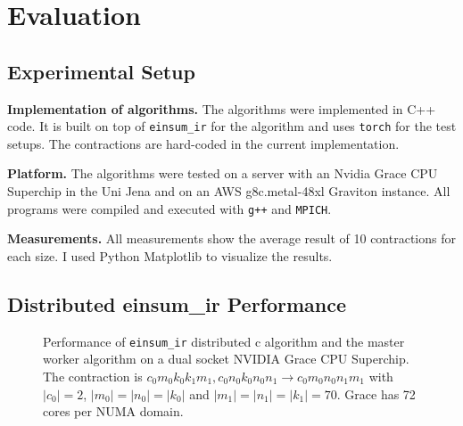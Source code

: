 \section{Evaluation}

\subsection{Experimental Setup}

\textbf{Implementation of algorithms.}
The algorithms were implemented in C++ code.
It is built on top of \texttt{einsum\_ir} for the algorithm and uses \texttt{torch} for the test setups.
The contractions are hard-coded in the current implementation.

\textbf{Platform.}
The algorithms were tested on a server with an Nvidia Grace CPU Superchip in the Uni Jena and on an AWS g8c.metal-48xl Graviton instance.
All programs were compiled and executed with \texttt{g++} and \texttt{MPICH}.

\textbf{Measurements.}
All measurements show the average result of 10 contractions for each size.
I used Python Matplotlib\cite{matplotlib} to visualize the results.


\subsection{Distributed einsum\_ir Performance}

\begin{figure}[ht]
  \caption{
    Performance of \texttt{einsum\_ir} distributed c algorithm and the master worker algorithm on a dual socket NVIDIA Grace CPU Superchip.
    The contraction is $c_0m_0k_0k_1m_1, c_0n_0k_0n_0n_1 \rightarrow c_0m_0n_0n_1m_1$ with $|c_0|=2$, $|m_0|=|n_0|=|k_0|$ and $|m_1|=|n_1|=|k_1|=70$.
    Grace has 72 cores per NUMA domain.
    }
  \label{fig:master_worker_perf}
\end{figure}

